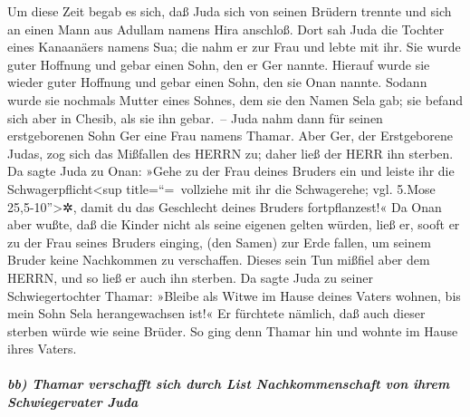  Um diese Zeit begab es sich, daß Juda sich von seinen
Brüdern trennte und sich an einen Mann aus Adullam namens Hira anschloß.
 Dort sah Juda die Tochter eines Kanaanäers namens Sua;
die nahm er zur Frau und lebte mit ihr.  Sie wurde guter
Hoffnung und gebar einen Sohn, den er Ger nannte.  Hierauf
wurde sie wieder guter Hoffnung und gebar einen Sohn, den sie Onan
nannte.  Sodann wurde sie nochmals Mutter eines Sohnes,
dem sie den Namen Sela gab; sie befand sich aber in Chesib, als sie ihn
gebar.~--  Juda nahm dann für seinen erstgeborenen Sohn
Ger eine Frau namens Thamar.  Aber Ger, der Erstgeborene
Judas, zog sich das Mißfallen des HERRN zu; daher ließ der HERR ihn
sterben.  Da sagte Juda zu Onan: »Gehe zu der Frau deines
Bruders ein und leiste ihr die Schwagerpflicht\textless sup
title=``=~vollziehe mit ihr die Schwagerehe; vgl. 5.Mose
25,5-10''\textgreater✲, damit du das Geschlecht deines Bruders
fortpflanzest!«  Da Onan aber wußte, daß die Kinder nicht
als seine eigenen gelten würden, ließ er, sooft er zu der Frau seines
Bruders einging, (den Samen) zur Erde fallen, um seinem Bruder keine
Nachkommen zu verschaffen.  Dieses sein Tun mißfiel aber
dem HERRN, und so ließ er auch ihn sterben.  Da sagte
Juda zu seiner Schwiegertochter Thamar: »Bleibe als Witwe im Hause
deines Vaters wohnen, bis mein Sohn Sela herangewachsen ist!« Er
fürchtete nämlich, daß auch dieser sterben würde wie seine Brüder. So
ging denn Thamar hin und wohnte im Hause ihres Vaters.

\hypertarget{bb-thamar-verschafft-sich-durch-list-nachkommenschaft-von-ihrem-schwiegervater-juda}{%
\subparagraph{bb) Thamar verschafft sich durch List Nachkommenschaft von
ihrem Schwiegervater
Juda}\label{bb-thamar-verschafft-sich-durch-list-nachkommenschaft-von-ihrem-schwiegervater-juda}}

